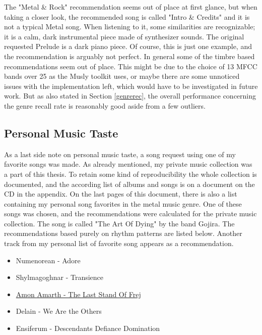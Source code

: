 \noindent The "Metal \& Rock" recommendation seems out of place at first glance, but when taking a closer look, the recommended song is called "Intro \& Credits" and it is not a typical Metal song. When listening to it, some similarities are recognizable; it is a calm, dark instrumental piece made of synthesizer sounds. The original requested Prelude is a dark piano piece. Of course, this is just one example, and the recommendation is arguably not perfect. In general some of the timbre based recommendations seem out of place. This might be due to the choice of 13 MFCC bands over 25 as the Musly toolkit uses, or maybe there are some unnoticed issues with the implementation left, which would have to be investigated in future work. But as also stated in Section \ref{genrerec}, the overall performance concerning the genre recall rate is reasonably good aside from a few outliers.

\subsection{Personal Music Taste}\label{personal}

As a last side note on personal music taste, a song request using one of my favorite songs was made. As already mentioned, my private music collection was a part of this thesis. To retain some kind of reproducibility the whole collection is documented, and the according list of albums and songs is on a document on the CD in the appendix. On the last pages of this document, there is also a list containing my personal song favorites in the metal music genre. One of these songs was chosen, and the recommendations were calculated for the private music collection. The song is called "The Art Of Dying" by the band Gojira. The recommendations based purely on rhythm patterns are listed below. Another track from my personal list of favorite song appears as a recommendation. 

\begin{itemize}
	\setlength\itemsep{-0.5em}
	\item Numenorean - Adore
	\item Shylmagoghnar - Transience
	\item \underline{Amon Amarth - The Last Stand Of Frej}
	\item Delain - We Are the Others
	\item Ensiferum - Descendants Defiance Domination
\end{itemize}

